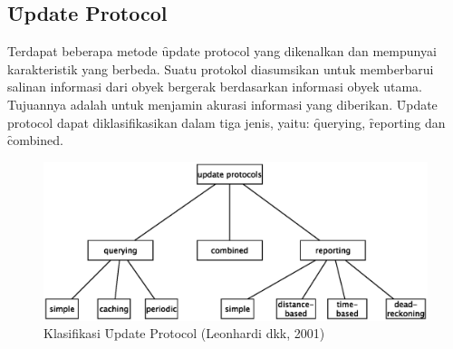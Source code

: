 \subsection{\f{Update Protocol}}

Terdapat beberapa metode \f{update protocol} yang dikenalkan dan mempunyai karakteristik
yang berbeda. Suatu protokol diasumsikan untuk memberbarui salinan informasi dari obyek
bergerak berdasarkan informasi obyek utama. Tujuannya adalah untuk menjamin akurasi informasi
yang diberikan. \f{Update protocol} dapat diklasifikasikan dalam tiga jenis, yaitu:
\f{querying}, \f{reporting} dan \f{combined}.

\noindent
\begin{figure}
  \centering
  \includegraphics[scale=0.60]
  {images/2-klasifikasi}
\caption{Klasifikasi \f{Update Protocol} (Leonhardi dkk, 2001)}
\label{fig:sistem}
\end{figure}





